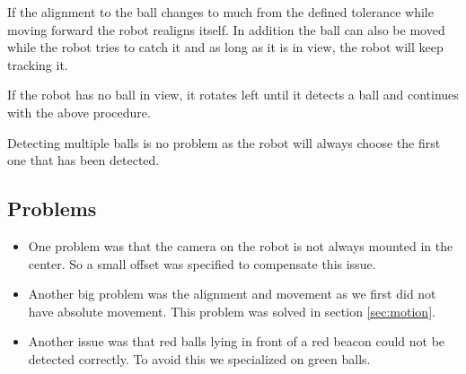 \documentclass[703031]{iisreport}
\begin{document}
If the alignment to the ball changes to much from the defined tolerance while moving forward the robot realigns itself. In addition the ball can also be moved while the robot tries to catch it and as long as it is in view, the robot will keep tracking it.

If the robot has no ball in view, it rotates left until it detects a ball and continues with the above procedure.

Detecting multiple balls is no problem as the robot will always choose the first one that has been detected.

\subsection{Problems}
\begin{itemize}
	\item One problem was that the camera on the robot is not always mounted in the center. So a small offset was specified to compensate this issue.
	\item Another big problem was the alignment and movement as we first did not have absolute movement. This problem was solved in  section \ref{sec:motion}.
	\item Another issue was that red balls lying in front of a red beacon could not be detected correctly. To avoid this we specialized on green balls.
\end{itemize}
\end{document}
